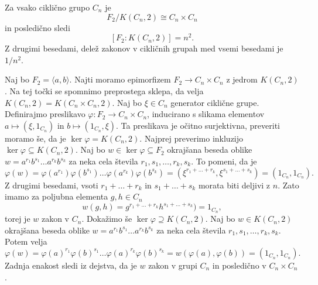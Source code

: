 \begin{trditev}
\label{trd_lastnosti_zakonov_ciklicne}
 Za vsako ciklično grupo $C_n$ je \begin{equation*}
 F_2 / K(C_n, 2) \cong C_n \times C_n
 \end{equation*}  
 in posledično sledi \begin{equation*}
\left[ F_2 : K(C_n, 2) \right] = n^2.
 \end{equation*}  
Z drugimi besedami, delež zakonov v cikličnih grupah med vsemi besedami je $1 / n^2$.
\end{trditev}
\begin{dokaz}
Naj bo $F_2 = \langle a, b \rangle$.
Najti moramo epimorfizem $F_2 \to C_n \times C_n$ z jedrom $K(C_n ,2)$. Na tej točki se spomnimo preprostega sklepa, da velja $K(C_n, 2) = K(C_n \times C_n, 2)$. Naj bo $\xi \in C_n$ generator ciklične grupe. Definirajmo preslikavo $\varphi: F_2 \to C_n \times C_n$,
inducirano s slikama elementov $a \mapsto (\xi, 1_{C_n})$ in $b \mapsto (1_{C_n}, \xi)$.
Ta preslikava je očitno surjektivna, preveriti moramo še, da je $\ker \varphi = K(C_n, 2)$. Najprej preverimo inkluzijo $\ker \varphi \subseteq K(C_n, 2)$.
Naj bo $w  \in \ker \varphi \subseteq  F_2$ okrajšana beseda oblike $w = a^{r_1} b^{s_1} \ldots a^{r_{k}} b^{s_k}$ za neka cela števila $r_1, s_1, \ldots , r_k , s_k$. To pomeni, da je \begin{equation*}
\varphi(w) = \varphi(a^{r_1}) \varphi(b^{s_1}) \ldots \varphi(a^{r_k}) \varphi(b^{s_k}) = \left( \xi^{r_1 + \ldots + r_k}, \xi^{s_1 + \ldots + s_k} \right) = \left( 1_{C_n} , 1_{C_n} \right).
\end{equation*}  
Z drugimi besedami, vsoti $r_1 + \ldots + r_k$ in $s_1 + \ldots + s_k$ morata biti deljivi z $n$. Zato imamo za poljubna elementa $g, h \in C_n$ \begin{equation*}
w(g, h) =  g^{r_1 + \ldots + r_k} h^{s_1 + \ldots + s_k}) = 1_{C_n},
\end{equation*}
torej je $w$ zakon v $C_n$. Dokažimo še $\ker \varphi \supseteq K(C_n, 2)$. Naj bo $w \in K(C_n, 2)$ okrajšana beseda oblike $w = a^{r_1} b^{s_1} \ldots a^{r_{k}} b^{s_k}$ za neka cela števila $r_1, s_1, \ldots , r_k , s_k$.
Potem velja \begin{equation*}
    \varphi(w) = \varphi(a)^{r_1} \varphi(b)^{s_1} \ldots \varphi(a)^{r_k} \varphi(b)^{s_k} = w(\varphi(a), \varphi(b)) = (1_{C_n} , 1_{C_n}).
    \end{equation*}
    Zadnja enakost sledi iz dejstva, da je $w$ zakon v grupi $C_n$ in posledično v $C_n \times C_n$.
\end{dokaz}

